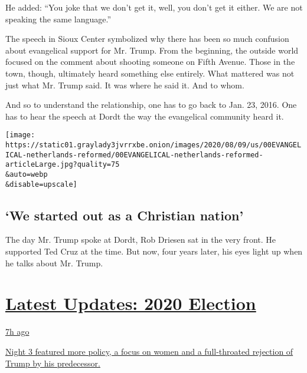 He added: ``You joke that we don't get it, well, you don't get it
either. We are not speaking the same language.''

The speech in Sioux Center symbolized why there has been so much
confusion about evangelical support for Mr. Trump. From the beginning,
the outside world focused on the comment about shooting someone on Fifth
Avenue. Those in the town, though, ultimately heard something else
entirely. What mattered was not just what Mr. Trump said. It was where
he said it. And to whom.

And so to understand the relationship, one has to go back to Jan. 23,
2016. One has to hear the speech at Dordt the way the evangelical
community heard it.

\texttt{[image: https://static01.graylady3jvrrxbe.onion/images/2020/08/09/us/00EVANGELICAL-netherlands-reformed/00EVANGELICAL-netherlands-reformed-articleLarge.jpg?quality=75\\\&auto=webp\\\&disable=upscale]}

\hypertarget{we-started-out-as-a-christian-nation}{%
\subsection{`We started out as a Christian
nation'}\label{we-started-out-as-a-christian-nation}}

The day Mr. Trump spoke at Dordt, Rob Driesen sat in the very front. He
supported Ted Cruz at the time. But now, four years later, his eyes
light up when he talks about Mr. Trump.

\hypertarget{latest-updates-2020-election}{%
\section{\texorpdfstring{\href{https://www.nytimes3xbfgragh.onion/live/2020/08/19/us/dnc-convention-election?action=click\&pgtype=Article\&state=default\&region=MAIN_CONTENT_1\&context=storylines_live_updates}{Latest
Updates: 2020
Election}}{Latest Updates: 2020 Election}}\label{latest-updates-2020-election}}

\href{https://www.nytimes3xbfgragh.onion/live/2020/08/19/us/dnc-convention-election?action=click\&pgtype=Article\&state=default\&region=MAIN_CONTENT_1\&context=storylines_live_updates\#night-3-featured-more-policy-a-focus-on-women-and-a-full-throated-rejection-of-trump-by-his-predecessor}{7h
ago}

\href{https://www.nytimes3xbfgragh.onion/live/2020/08/19/us/dnc-convention-election?action=click\&pgtype=Article\&state=default\&region=MAIN_CONTENT_1\&context=storylines_live_updates\#night-3-featured-more-policy-a-focus-on-women-and-a-full-throated-rejection-of-trump-by-his-predecessor}{Night
3 featured more policy, a focus on women and a full-throated rejection
of Trump by his predecessor.}

